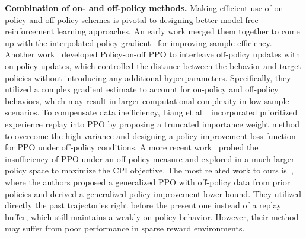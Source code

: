 \textbf{Combination of on- and off-policy methods.} Making efficient use of on-policy and off-policy schemes is pivotal to designing better model-free reinforcement learning approaches. An early work merged them together to come up with the interpolated policy gradient~\cite{gu2017interpolated} for improving sample efficiency. Another work~\cite{fakoor2020p3o} developed Policy-on-off PPO to interleave off-policy updates with on-policy updates, which controlled the distance between the behavior and target policies without introducing any additional hyperparameters. Specifically, they utilized a complex gradient estimate to account for on-policy and off-policy behaviors, which may result in larger computational complexity in low-sample scenarios.
To compensate data inefficiency, Liang et al.~\cite{liang2021ptr} incorporated prioritized experience replay into PPO by proposing a truncated importance weight method to overcome the high variance and designing a policy improvement loss function for PPO under off-policy conditions. A more recent work~\cite{chen2023sufficiency} probed the insufficiency of PPO under an off-policy measure and explored in a much larger policy space to maximize the CPI objective.
The most related work to ours is~\cite{queeney2021generalized}, where the authors proposed a generalized PPO with off-policy data from prior policies and derived a generalized policy improvement lower bound. They utilized directly the past trajectories right before the present one instead of a replay buffer, which still maintains a weakly on-policy behavior. However, their method may suffer from poor performance in sparse reward environments.
